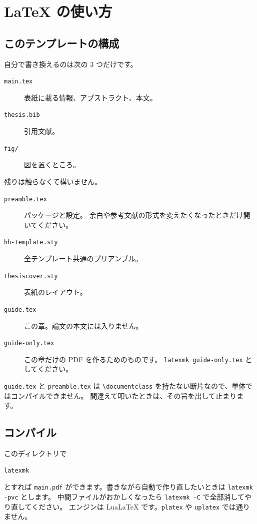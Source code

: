 \section{\LaTeX{} の使い方}
\label{sec:guide_latex}

\subsection{このテンプレートの構成}

自分で書き換えるのは次の 3 つだけです。

\begin{description}
  \item[\texttt{main.tex}] 表紙に載る情報、アブストラクト、本文。
  \item[\texttt{thesis.bib}] 引用文献。
  \item[\texttt{fig/}] 図を置くところ。
\end{description}

\noindent
残りは触らなくて構いません。

\begin{description}
  \item[\texttt{preamble.tex}] パッケージと設定。
    余白や参考文献の形式を変えたくなったときだけ開いてください。
  \item[\texttt{hh-template.sty}] 全テンプレート共通のプリアンブル。
  \item[\texttt{thesiscover.sty}] 表紙のレイアウト。
  \item[\texttt{guide.tex}] この章。論文の本文には入りません。
  \item[\texttt{guide-only.tex}] この章だけの PDF を作るためのものです。
    \verb|latexmk guide-only.tex| としてください。
\end{description}

\noindent
\texttt{guide.tex} と \texttt{preamble.tex} は
\verb|\documentclass| を持たない断片なので、単体ではコンパイルできません。
間違えて叩いたときは、その旨を出して止まります。

\subsection{コンパイル}

このディレクトリで
\begin{verbatim}
latexmk
\end{verbatim}
とすれば \texttt{main.pdf} ができます。書きながら自動で作り直したいときは
\verb|latexmk -pvc| とします。
中間ファイルがおかしくなったら \verb|latexmk -C| で全部消してやり直してください。
エンジンは LuaLaTeX です。\texttt{platex} や \texttt{uplatex} では通りません。

